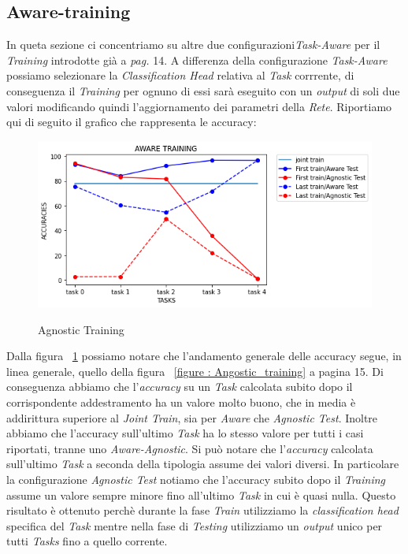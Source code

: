 \subsection{Aware-training}
In queta sezione ci concentriamo su altre due configurazioni\textit{Task-Aware} per il \textit{Training} introdotte già a \textit{pag.} 14.
A differenza della configurazione \textit{Task-Aware} possiamo selezionare la \textit{Classification Head} relativa al \textit{Task} corrrente, di conseguenza il \textit{Training} per ognuno di essi sarà eseguito con un \textit{output} di soli due valori modificando quindi l'aggiornamento dei parametri della \textit{Rete}.\newline
Riportiamo qui di seguito il grafico che rappresenta le accuracy:
\begin{figure}[ht]
\centering
\caption{Agnostic Training}
\includegraphics[width=\linewidth]{Aware_Agnostic-Aware.png}
\label{figure : Aware_Training}
\end{figure}
\newline
Dalla figura ~\ref{figure : Aware_Training} possiamo notare che l'andamento generale delle accuracy segue, in linea generale, quello della figura ~\ref{figure : Angostic_training} a pagina 15.
Di conseguenza abbiamo che l'\textit{accuracy} su un \textit{Task} calcolata subito dopo il corrispondente addestramento ha un valore molto buono, che in media è addirittura superiore al \textit{Joint Train}, sia per \textit{Aware} che \textit{Agnostic Test}. Inoltre abbiamo che l'accuracy sull'ultimo \textit{Task} ha lo stesso valore per tutti i casi riportati, tranne uno \textit{Aware-Agnostic}. Si può notare che l'\textit{accuracy} calcolata sull'ultimo \textit{Task} a seconda della tipologia assume dei valori diversi.
In particolare la configurazione \textit{Agnostic Test} notiamo che l'accuracy subito dopo il \textit{Training} assume un valore sempre minore fino all'ultimo \textit{Task} in cui è quasi nulla. Questo risultato è ottenuto perchè durante la fase \textit{Train} utilizziamo la \textit{classification head} specifica del \textit{Task} mentre nella fase di \textit{Testing} utilizziamo un \textit{output} unico per tutti \textit{Tasks} fino a quello corrente.
